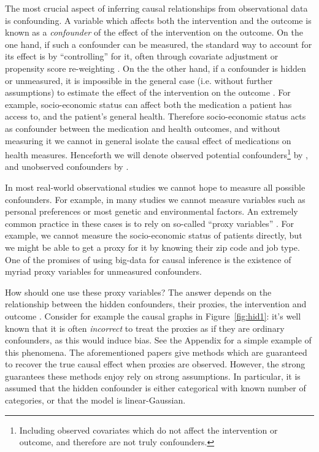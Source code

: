 \documentclass{article}
\begin{document}
The most crucial aspect of inferring causal relationships from observational data is confounding. A variable which affects both the intervention and the outcome is known as a \emph{confounder} of the effect of the intervention on the outcome. On the one hand, if such a confounder can be measured, the standard way to account for its effect is by ``controlling'' for it, often through covariate adjustment or propensity score re-weighting \citep{morgan2014counterfactuals}. On the the other hand, if a confounder is hidden or unmeasured, it is impossible in the general case (i.e. without further assumptions) to estimate the effect of the intervention on the outcome \citep{pearl2009causality}. For example, socio-economic status can affect both the medication a patient has access to, and the patient's general health. Therefore socio-economic status acts as confounder between the medication and health outcomes, and without measuring it we cannot in general isolate the causal effect of medications on health measures. Henceforth we will denote observed potential confounders\footnote{Including observed covariates which do not affect the intervention or outcome, and therefore are not truly confounders.} by , and unobserved confounders by . 


In most real-world observational studies we cannot hope to measure all possible confounders. For example, in many studies we cannot measure variables such as personal preferences or most genetic and environmental factors. An extremely common practice in these cases is to rely on so-called ``proxy variables'' \cite[Ch. 11]{montgomery2000measuring,angrist2008mostly,maddala1992introduction}. For example, we cannot measure the socio-economic status of patients directly, but we might be able to get a proxy for it by knowing their zip code and job type. One of the promises of using big-data for causal inference is the existence of myriad proxy variables for unmeasured confounders. 

How should one use these proxy variables? The answer depends on the relationship between the hidden confounders, their proxies, the intervention and outcome \citep{kuroki2011measurement,miao2016identifying}. Consider for example the causal graphs in Figure~\ref{fig:hid1}: it's well known \citep{griliches1986errors,fuller1987measurement,greenland2008bias,kuroki2011measurement,pearl2012measurement} that it is often \emph{incorrect} to treat the proxies  as if they are ordinary confounders, as this would induce bias. See the Appendix for a simple example of this phenomena. The aforementioned papers give methods which are guaranteed to recover the true causal effect when proxies are observed. However, the strong guarantees these methods enjoy rely on strong assumptions. In particular, it is assumed that the hidden confounder is either categorical with known number of categories, or that the model is linear-Gaussian. 
\end{document}
